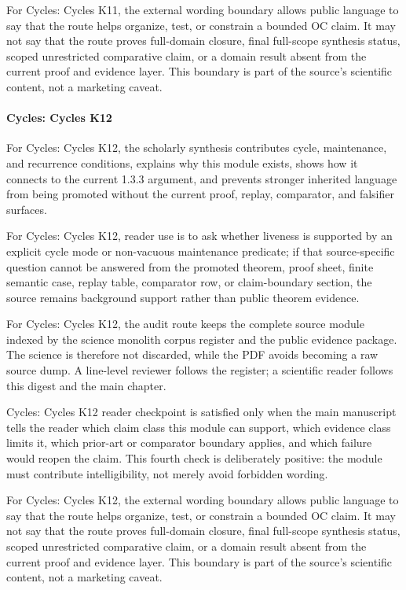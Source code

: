 For Cycles: Cycles K11, the external wording boundary allows public language to say that the route helps organize, test, or constrain a bounded OC claim. It may not say that the route proves full-domain closure, final full-scope synthesis status, scoped unrestricted comparative claim, or a domain result absent from the current proof and evidence layer. This boundary is part of the source's scientific content, not a marketing caveat.


\paragraph{Cycles: Cycles K12}

For Cycles: Cycles K12, the scholarly synthesis contributes cycle, maintenance, and recurrence conditions, explains why this module exists, shows how it connects to the current 1.3.3 argument, and prevents stronger inherited language from being promoted without the current proof, replay, comparator, and falsifier surfaces.


For Cycles: Cycles K12, reader use is to ask whether liveness is supported by an explicit cycle mode or non-vacuous maintenance predicate; if that source-specific question cannot be answered from the promoted theorem, proof sheet, finite semantic case, replay table, comparator row, or claim-boundary section, the source remains background support rather than public theorem evidence.


For Cycles: Cycles K12, the audit route keeps the complete source module indexed by the science monolith corpus register and the public evidence package. The science is therefore not discarded, while the PDF avoids becoming a raw source dump. A line-level reviewer follows the register; a scientific reader follows this digest and the main chapter.


Cycles: Cycles K12 reader checkpoint is satisfied only when the main manuscript tells the reader which claim class this module can support, which evidence class limits it, which prior-art or comparator boundary applies, and which failure would reopen the claim. This fourth check is deliberately positive: the module must contribute intelligibility, not merely avoid forbidden wording.


For Cycles: Cycles K12, the external wording boundary allows public language to say that the route helps organize, test, or constrain a bounded OC claim. It may not say that the route proves full-domain closure, final full-scope synthesis status, scoped unrestricted comparative claim, or a domain result absent from the current proof and evidence layer. This boundary is part of the source's scientific content, not a marketing caveat.


